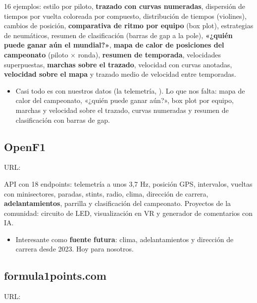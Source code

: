 16 ejemplos: estilo por piloto, \textbf{trazado con curvas numeradas}, dispersión de tiempos por vuelta coloreada por compuesto, distribución de tiempos (violines), cambios de posición, \textbf{comparativa de ritmo por equipo} (box plot), estrategias de neumáticos, resumen de clasificación (barras de gap a la pole), \textbf{«¿quién puede ganar aún el mundial?»}, \textbf{mapa de calor de posiciones del campeonato} (piloto × ronda), \textbf{resumen de temporada}, velocidades superpuestas, \textbf{marchas sobre el trazado}, velocidad con curvas anotadas, \textbf{velocidad sobre el mapa} y trazado medio de velocidad entre temporadas.

\begin{itemize}
\item Casi todo es \si{} con nuestros datos (la telemetría, \parcial{}). Lo que nos falta: mapa de calor del campeonato, «¿quién puede ganar aún?», box plot por equipo, marchas y velocidad sobre el trazado, curvas numeradas y resumen de clasificación con barras de gap.
\end{itemize}

\subsection{OpenF1}

URL: \href{https://openf1.org/}{}

API con 18 endpoints: telemetría a unos 3,7 Hz, posición GPS, intervalos, vueltas con minisectores, paradas, stints, radio, clima, dirección de carrera, \textbf{adelantamientos}, parrilla y clasificación del campeonato. Proyectos de la comunidad: circuito de LED, visualización en VR y generador de comentarios con IA.

\begin{itemize}
\item Interesante como \textbf{fuente futura}: clima, adelantamientos y dirección de carrera desde 2023. Hoy \no{} para nosotros.
\end{itemize}

\subsection{formula1points.com}

URL: \href{https://www.formula1points.com/}{}

